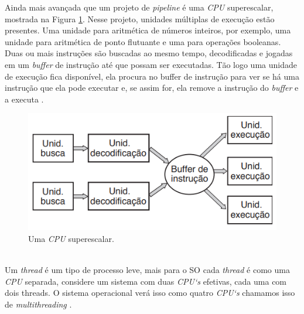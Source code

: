 Ainda mais avançada que um projeto de \emph{\emph{pipeline}} é uma \emph{CPU} superescalar, mostrada na Figura \ref{fig:Processador2}. Nesse projeto, unidades múltiplas de execução estão presentes. Uma unidade para aritmética de números inteiros, por exemplo, uma unidade para aritmética de ponto flutuante e uma para operações booleanas. Duas ou mais instruções são buscadas ao mesmo tempo, decodificadas e jogadas em um \emph{buffer} de instrução até que possam ser executadas. Tão logo uma unidade de execução fica disponível, ela procura no buffer de instrução para ver se há uma instrução que ela pode executar e, se assim for, ela remove a instrução do \emph{buffer} e a executa \cite{Tanenbaum2016}. 
\begin{figure}[htpb]
    \centering
   \includegraphics[scale=1]{imagens/Processador2.png}
   \caption{Uma \emph{CPU} superescalar. \cite{Tanenbaum2016}}
   \label{fig:Processador2}
\end{figure}\\

Um \emph{thread} é um tipo de processo leve, mais para o SO cada \emph{thread} é como uma \emph{CPU} separada, considere um sistema com duas \emph{CPU`s} efetivas, cada uma com dois threads. O sistema operacional verá isso como quatro \emph{CPU`s} chamamos isso de \emph{multithreading} \cite{Tanenbaum2016}.